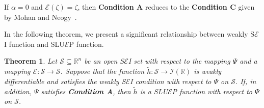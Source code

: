 \documentclass[12pt, reqno]{amsart}
\newtheorem{theorem}{Theorem}[section]
\theoremstyle{definition}
\theoremstyle{remark}
\numberwithin{equation}{section}
\begin{document}
\medskip
\noindent
If ${\alpha} = 0$ and ${\mathcal{E}}(\zeta) = \zeta$, then \textbf{Condition A} reduces to the \textbf{Condition C} given by Mohan and Neogy~\cite{Neogy}.

\medskip
\noindent
In the following theorem, we present a significant relationship between weakly S$\mathcal{E}$I function and SLU$\mathcal{E}$P function.
\begin{theorem}
	Let $\mathcal{S} \subseteq \mathbb{R}^{n}$ be an open S$\mathcal{E}$I set with respect to the mapping $\Psi$ and a mapping $\mathcal{E} : \mathcal{S} \to \mathcal{S}$. Suppose that the function $\tilde{h} : \mathcal{S} \to \mathcal{I}(\mathbb{R})$ is weakly differentiable and satisfies the weakly S$\mathcal{E}$I condition with respect to $\Psi$ on $\mathcal{S}$. If, in addition, $\Psi$ satisfies \textbf{Condition A}, then $\tilde{h}$ is a SLU$\mathcal{E}$P function with respect to $\Psi$ on $\mathcal{S}$.
\end{theorem}
\end{document}
